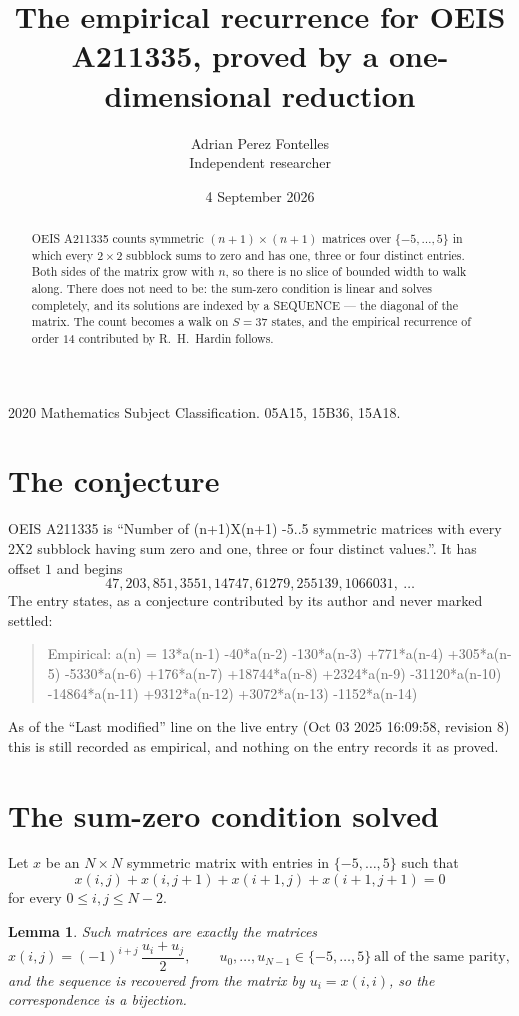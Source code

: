 \documentclass[11pt,a4paper]{article}
\title{The empirical recurrence for OEIS A211335, proved by a one-dimensional reduction}
\author{Adrian Perez Fontelles\\ \small Independent researcher}
\date{4 September 2026}
\theoremstyle{plain}
\newtheorem{lemma}[theorem]{Lemma}
\theoremstyle{definition}
\begin{document}
\maketitle

\begin{abstract}
OEIS A211335 counts symmetric $(n+1)\times(n+1)$ matrices over
$\{-5,\dots,5\}$ in which every $2\times2$ subblock sums to zero and has one, three or four distinct
entries. Both sides of the matrix grow with $n$, so there is no slice of bounded width to walk
along. There does not need to be: the sum-zero condition is linear and solves completely, and
its solutions are indexed by a SEQUENCE --- the diagonal of the matrix. The count becomes a walk
on $S=37$ states, and the empirical recurrence of order $14$ contributed by R.~H.~Hardin
follows.
\end{abstract}

\noindent\small 2020 Mathematics Subject Classification. 05A15, 15B36, 15A18.\normalsize

\section{The conjecture}

OEIS A211335 is ``Number of (n+1)X(n+1) -5..5 symmetric matrices with every 2X2 subblock having sum zero and one, three or four distinct values.''. It has offset $1$ and begins
\[
47, 203, 851, 3551, 14747, 61279, 255139, 1066031,\ \dots
\]
The entry states, as a conjecture contributed by its author and never marked settled:
\begin{quote}
Empirical: a(n) = 13*a(n-1) -40*a(n-2) -130*a(n-3) +771*a(n-4) +305*a(n-5) -5330*a(n-6) +176*a(n-7) +18744*a(n-8) +2324*a(n-9) -31120*a(n-10) -14864*a(n-11) +9312*a(n-12) +3072*a(n-13) -1152*a(n-14)
\end{quote}
As of the ``Last modified'' line on the live entry (Oct 03 2025 16:09:58, revision 8) this is still
recorded as empirical, and nothing on the entry records it as proved.

\section{The sum-zero condition solved}

Let $x$ be an $N\times N$ symmetric matrix with entries in $\{-5,\dots,5\}$ such that
\[
x(i,j)+x(i,j{+}1)+x(i{+}1,j)+x(i{+}1,j{+}1)=0
\]
for every $0\le i,j\le N-2$.

\begin{lemma}\label{lem:solve}
Such matrices are exactly the matrices
\[
x(i,j)=(-1)^{i+j}\,\frac{u_i+u_j}{2},
\qquad u_0,\dots,u_{N-1}\in\{-5,\dots,5\}\ \text{all of the same parity},
\]
and the sequence is recovered from the matrix by $u_i=x(i,i)$, so the correspondence is a
bijection.
\end{lemma}
\end{document}
